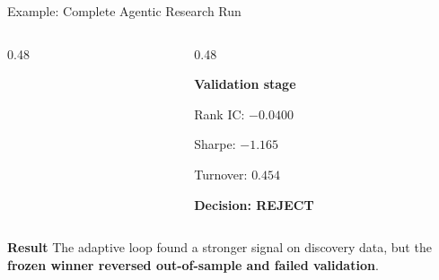 \documentclass[10pt,aspectratio=169]{beamer}
\begin{document}
\begin{frame}{Example: Complete Agentic Research Run}
\begin{columns}[T,onlytextwidth]
\begin{column}{0.48\textwidth}
\end{column}

\begin{column}{0.48\textwidth}

\textbf{Validation stage}
\centering

Rank IC: \textbf{$-0.0400$}

Sharpe: \textbf{$-1.165$}

Turnover: $0.454$

\vspace{0.08cm}

\textbf{Decision: REJECT}

\end{column}

\end{columns}

\vspace{0.10cm}

\textbf{Result}
The adaptive loop found a stronger signal on discovery data, but the
\textbf{frozen winner reversed out-of-sample and failed validation}.

\end{frame}
\end{document}
